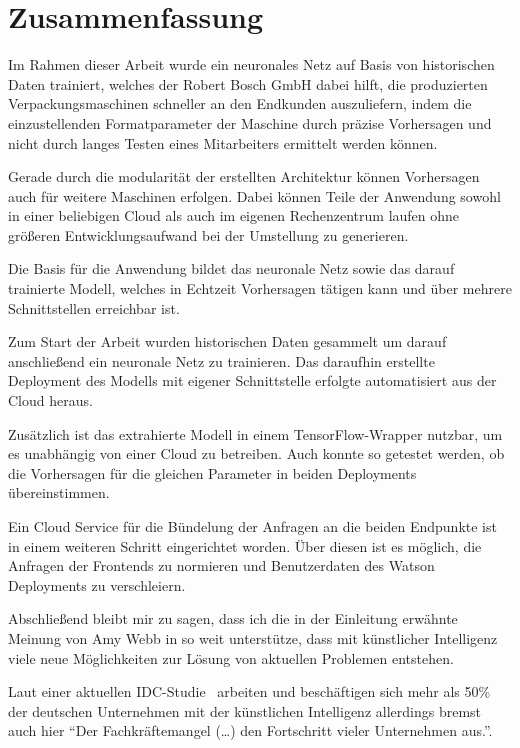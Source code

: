 \chapter{Zusammenfassung}
\label{ch:zusammenfassung}
Im Rahmen dieser Arbeit wurde ein neuronales Netz auf Basis von historischen Daten trainiert, welches der Robert Bosch
GmbH dabei hilft, die produzierten Verpackungsmaschinen schneller an den Endkunden auszuliefern, indem die
einzustellenden Formatparameter der Maschine durch präzise Vorhersagen und nicht durch langes Testen eines Mitarbeiters
ermittelt werden können.

Gerade durch die modularität der erstellten Architektur können Vorhersagen auch für weitere Maschinen erfolgen. Dabei
können Teile der Anwendung sowohl in einer beliebigen Cloud als auch im eigenen Rechenzentrum laufen ohne größeren
Entwicklungsaufwand bei der Umstellung zu generieren.

Die Basis für die Anwendung bildet das neuronale Netz sowie das darauf trainierte Modell, welches in Echtzeit
Vorhersagen tätigen kann und über mehrere Schnittstellen erreichbar ist.

Zum Start der Arbeit wurden historischen Daten gesammelt um darauf anschließend ein neuronale Netz zu trainieren. Das
daraufhin erstellte Deployment des Modells mit eigener Schnittstelle erfolgte automatisiert aus der Cloud heraus.

Zusätzlich ist das extrahierte Modell in einem TensorFlow-Wrapper nutzbar, um es unabhängig von einer Cloud zu
betreiben. Auch konnte so getestet werden, ob die Vorhersagen für die gleichen Parameter in beiden Deployments
übereinstimmen.

Ein Cloud Service für die Bündelung der Anfragen an die beiden Endpunkte ist in einem weiteren Schritt eingerichtet
worden. Über diesen ist es möglich, die Anfragen der Frontends zu normieren und Benutzerdaten des Watson Deployments zu
verschleiern.

Abschließend bleibt mir zu sagen, dass ich die in der Einleitung erwähnte Meinung von Amy Webb in so weit unterstütze,
dass mit künstlicher Intelligenz viele neue Möglichkeiten zur Lösung von aktuellen Problemen entstehen.

Laut einer aktuellen IDC-Studie~\cite{article_zusammenfassung_idc} arbeiten und beschäftigen sich mehr als 50\% der
deutschen Unternehmen mit der künstlichen Intelligenz allerdings bremst auch hier \enquote{Der Fachkräftemangel (\ldots)
den Fortschritt vieler Unternehmen aus.}.